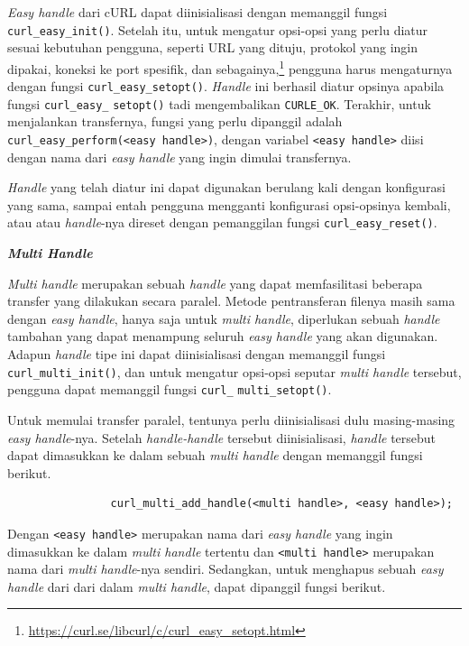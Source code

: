 \documentclass[a4paper,twoside]{article}
\begin{document}
\begin{enumerate}
\textit{Easy handle} dari cURL dapat diinisialisasi dengan memanggil fungsi \verb|curl_easy_init()|. Setelah itu, untuk mengatur opsi-opsi yang perlu diatur sesuai kebutuhan pengguna, seperti URL yang dituju, \linebreak protokol yang ingin dipakai, koneksi ke port spesifik, dan sebagainya,\footnote{\href{https://curl.se/libcurl/c/curl\_easy\_setopt.html}{https://curl.se/libcurl/c/curl\_easy\_setopt.html}} pengguna harus mengaturnya dengan fungsi \verb|curl_easy_setopt()|. \textit{Handle} ini berhasil diatur opsinya apabila fungsi \verb|curl_easy_| \linebreak \verb|setopt()| tadi mengembalikan \verb|CURLE_OK|. Terakhir, untuk menjalankan transfernya, fungsi yang perlu dipanggil adalah \verb|curl_easy_perform(<easy handle>)|, dengan variabel \verb|<easy handle>| diisi dengan nama dari \textit{easy handle} yang ingin dimulai transfernya.

\textit{Handle} yang telah diatur ini dapat digunakan berulang kali dengan konfigurasi yang sama, sampai entah pengguna mengganti konfigurasi opsi-opsinya kembali, atau atau \textit{handle}-nya direset dengan pemanggilan fungsi \verb|curl_easy_reset()|.

\vspace{\baselineskip}
\textbf{\textit{Multi Handle}}
\label{sec:cmodules-libcurl-handlemulti}

\textit{Multi handle} merupakan sebuah \textit{handle} yang dapat memfasilitasi beberapa transfer yang \mbox{dilakukan} secara paralel. Metode pentransferan filenya masih sama dengan \textit{easy handle}, hanya saja untuk \textit{multi handle}, diperlukan sebuah \textit{handle} tambahan yang dapat menampung seluruh \textit{easy handle} yang akan digunakan. Adapun \textit{handle} tipe ini dapat diinisialisasi dengan memanggil fungsi \verb|curl_multi_init()|, dan untuk mengatur opsi-opsi seputar \textit{multi handle} tersebut, pengguna dapat memanggil fungsi \verb|curl_| \linebreak \verb|multi_setopt()|.

Untuk memulai transfer paralel, tentunya perlu diinisialisasi dulu masing-masing \textit{easy handle}-nya. Setelah \textit{handle-handle} tersebut diinisialisasi, \textit{handle} tersebut dapat dimasukkan ke dalam sebuah \textit{multi handle} dengan memanggil fungsi berikut.

\begin{verbatim}
                curl_multi_add_handle(<multi handle>, <easy handle>);
\end{verbatim}
\noindent
Dengan \verb|<easy handle>| merupakan nama dari \textit{easy handle} yang ingin dimasukkan ke dalam \textit{multi handle} tertentu dan \verb|<multi handle>| merupakan nama dari \textit{multi handle}-nya sendiri. Sedangkan, untuk menghapus sebuah \textit{easy handle} dari dari dalam \textit{multi handle}, dapat dipanggil fungsi berikut.


\end{enumerate}
\end{document}
